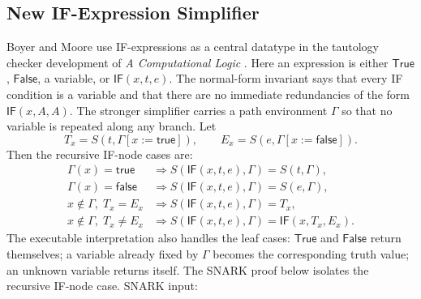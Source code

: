 \documentclass[runningheads]{llncs}
\begin{document}
\subsection{New IF-Expression Simplifier}

Boyer and Moore use IF-expressions as a central datatype in the tautology
checker development of \emph{A Computational Logic} \cite{BoyerMoore1979}.
Here an expression is either \(\mathsf{True}\), \(\mathsf{False}\), a variable,
or \(\mathsf{IF}(x,t,e)\).  The normal-form invariant says that every IF
condition is a variable and that there are no immediate redundancies of the
form \(\mathsf{IF}(x,A,A)\).  The stronger simplifier carries a path
environment \(\Gamma\) so that no variable is repeated along any branch.  Let
\[
  T_x=S(t,\Gamma[x:=\mathsf{true}]),
  \qquad
  E_x=S(e,\Gamma[x:=\mathsf{false}]).
\]
Then the recursive IF-node cases are:
\begin{align*}
  \Gamma(x)=\mathsf{true}
    &\Rightarrow S(\mathsf{IF}(x,t,e),\Gamma)=S(t,\Gamma),\\
  \Gamma(x)=\mathsf{false}
    &\Rightarrow S(\mathsf{IF}(x,t,e),\Gamma)=S(e,\Gamma),\\
  x\notin\Gamma,\; T_x=E_x
    &\Rightarrow S(\mathsf{IF}(x,t,e),\Gamma)=T_x,\\
  x\notin\Gamma,\; T_x\neq E_x
    &\Rightarrow S(\mathsf{IF}(x,t,e),\Gamma)=\mathsf{IF}(x,T_x,E_x).
\end{align*}
The executable interpretation also handles the leaf cases:
\(\mathsf{True}\) and \(\mathsf{False}\) return themselves; a variable already
fixed by \(\Gamma\) becomes the corresponding truth value; an unknown variable
returns itself.  The SNARK proof below isolates the recursive IF-node case.
SNARK input:
\end{document}
